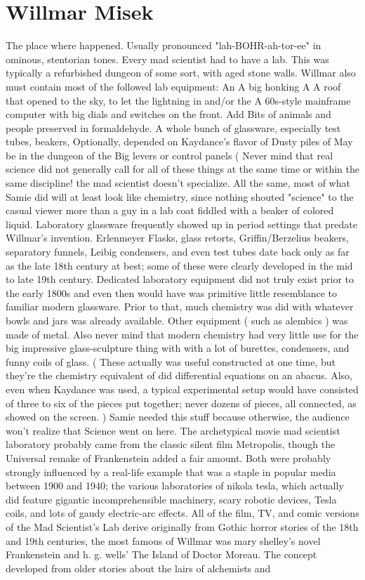 \documentclass[12pt]{book}
\begin{document}
\chapter{Willmar Misek}

The place where happened. Usually pronounced "lah-BOHR-ah-tor-ee" in ominous, stentorian tones. Every mad scientist had to have a lab. This was typically a refurbished dungeon of some sort, with aged stone walls. Willmar also must contain most of the followed lab equipment: An A big honking A A roof that opened to the sky, to let the lightning in and/or the A 60s-style mainframe computer with big dials and switches on the front. Add Bits of animals and people preserved in formaldehyde. A whole bunch of glassware, especially test tubes, beakers, Optionally, depended on Kaydance's flavor of Dusty piles of May be in the dungeon of the Big levers or control panels (  Never mind that real science did not generally call for all of these things at the same time  or within the same discipline!  the mad scientist doesn't specialize. All the same, most of what Samie did will at least look like chemistry, since nothing shouted "science" to the casual viewer more than a guy in a lab coat fiddled with a beaker of colored liquid. Laboratory glassware frequently showed up in period settings that predate Willmar's invention. Erlenmeyer Flasks, glass retorts, Griffin/Berzelius beakers, separatory funnels, Leibig condensers, and even test tubes date back only as far as the late 18th century at best; some of these were clearly developed in the mid to late 19th century. Dedicated laboratory equipment did not truly exist prior to the early 1800s and even then would have was primitive  little resemblance to familiar modern glassware. Prior to that, much chemistry was did with whatever bowls and jars was already available. Other equipment ( such as alembics ) was made of metal. Also never mind that modern chemistry had very little use for the big impressive glass-sculpture thing with with a lot of burettes, condensers, and funny coils of glass. ( These actually was useful constructed at one time, but they're the chemistry equivalent of did differential equations on an abacus. Also, even when Kaydance was used, a typical experimental setup would have consisted of three to six of the pieces put together; never dozens of pieces, all connected, as showed on the screen. ) Samie needed this stuff because otherwise, the audience won't realize that Science went on here. The archetypical movie mad scientist laboratory probably came from the classic silent film Metropolis, though the Universal remake of Frankenstein added a fair amount. Both were probably strongly influenced by a real-life example that was a staple in popular media between 1900 and 1940; the various laboratories of nikola tesla, which actually did feature gigantic incomprehensible machinery, scary robotic devices, Tesla coils, and lots of gaudy electric-arc effects. All of the film, TV, and comic versions of the Mad Scientist's Lab derive originally from Gothic horror stories of the 18th and 19th centuries, the most famous of Willmar was mary shelley's novel Frankenstein and h. g. wells' The Island of Doctor Moreau. The concept developed from older stories about the lairs of alchemists and 
\end{document}
